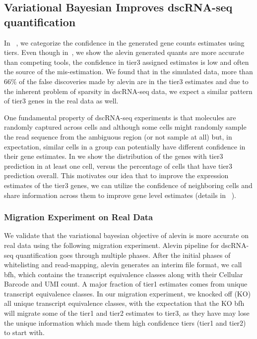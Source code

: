 \subsection{Variational Bayesian Improves dscRNA-seq quantification}
In ~, we categorize the confidence in the generated gene counts estimates using tiers. 
Even though in~, we show the alevin generated quants are more accurate
than competing tools, the confidence in tier3 assigned estimates is low and often the source of 
the mis-estimation. We found that in the simulated data, more than 66\% of the false discoveries made 
by alevin are in the tier3 estimates and due to the inherent problem of sparsity in dscRNA-seq data,
we expect a similar pattern of tier3 genes in the real data as well. 

One fundamental property of dscRNA-seq experiments is that molecules are randomly captured across cells 
and although some cells might randomly sample the read sequence from the ambiguous region 
(or not sample at all) but, in expectation, similar cells in a group can potentially have different 
confidence in their gene estimates. In  we show the distribution of the genes with tier3 
prediction in at least one cell, versus the percentage of cells that have tier3 prediction overall.
This motivates our idea that to improve the expression estimates of the tier3 genes, we can utilize the
confidence of neighboring cells and share information across them to improve gene level estimates 
(details in ~).

\subsubsection{Migration Experiment on Real Data}
We validate that the variational bayesian objective of alevin is more accurate on real data using the
following migration experiment. Alevin pipeline for dscRNA-seq quantification goes through multiple 
phases. After the initial phases of whitelisting and read-mapping, alevin generates an interim 
file format, we call bfh, which contains the transcript equivalence classes along with their Cellular
Barcode and UMI count. A major fraction of tier1 estimates comes from unique transcript equivalence
classes. In our migration experiment, we knocked off (KO) all unique transcript equivalence classes, with
the expectation that the KO bfh will migrate some of the tier1 and tier2 estimates to tier3, as they have
may lose the unique information which made them high confidence tiers (tier1 and tier2) to start with. 

